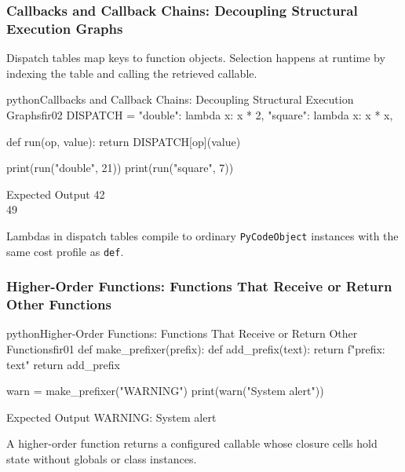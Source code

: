 \documentclass[a4paper,twoside]{report}
\begin{document}
\subsubsection{Callbacks and Callback Chains: Decoupling Structural Execution Graphs}

Dispatch tables map keys to function objects. Selection happens at runtime by indexing the table and calling the retrieved callable.

\begin{codebox}[]{python}{Callbacks and Callback Chains: Decoupling Structural Execution Graphs}{fir02}
DISPATCH = {
    "double": lambda x: x * 2,
    "square": lambda x: x * x,
}

def run(op, value):
    return DISPATCH[op](value)

print(run("double", 21))
print(run("square", 7))
\end{codebox}


\begin{iobox}{Expected Output}
42 \\
49 \\
\end{iobox}




Lambdas in dispatch tables compile to ordinary \texttt{PyCodeObject} instances with the same cost profile as \texttt{def}.

\subsubsection{Higher-Order Functions: Functions That Receive or Return Other Functions}

\begin{codebox}[]{python}{Higher-Order Functions: Functions That Receive or Return Other Functions}{fir01}
def make_prefixer(prefix):
    def add_prefix(text):
        return f"{prefix}: {text}"
    return add_prefix

warn = make_prefixer("WARNING")
print(warn("System alert"))
\end{codebox}


\begin{iobox}{Expected Output}
WARNING: System alert \\
\end{iobox}




A higher-order function returns a configured callable whose closure cells hold state without globals or class instances.
\end{document}
